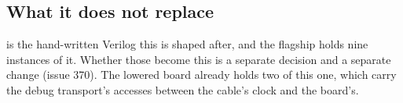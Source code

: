 \subsection{What it does not replace}

 is the hand-written Verilog this is
shaped after, and the flagship holds nine instances of it. Whether
those become this is a separate decision and a separate change
(issue 370). The lowered board already holds two of this one, which
carry the debug transport's accesses between the cable's clock and
the board's.
